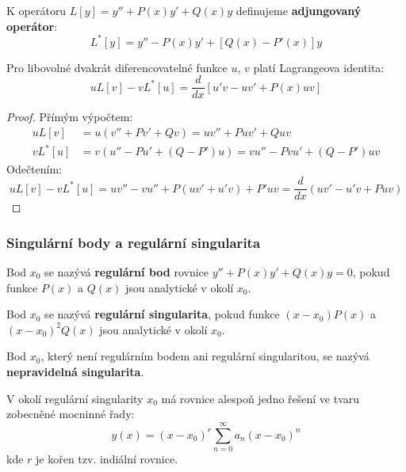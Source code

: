 \begin{definition}
K operátoru $L[y] = y'' + P(x)y' + Q(x)y$ definujeme \textbf{adjungovaný operátor}:
\[
L^*[y] = y'' - P(x)y' + [Q(x) - P'(x)]y
\]
\end{definition}

\begin{theorem}
Pro libovolné dvakrát diferencovatelné funkce $u$, $v$ platí Lagrangeova identita:
\[
uL[v] - vL^*[u] = \frac{d}{dx}[u'v - uv' + P(x)uv]
\]
\end{theorem}

\begin{proof}
Přímým výpočtem:
\begin{align*}
uL[v] &= u(v'' + Pv' + Qv) = uv'' + Puv' + Quv \\
vL^*[u] &= v(u'' - Pu' + (Q - P')u) = vu'' - Pvu' + (Q - P')uv
\end{align*}
Odečtením:
\[
uL[v] - vL^*[u] = u v'' - v u'' + P(uv' + u'v) + P'uv = \frac{d}{dx}(uv' - u'v + Puv)
\]
\end{proof}

\subsubsection{Singulární body a regulární singularita}
\label{subsubsec:singularni-body}

\begin{definition}
Bod $x_0$ se nazývá \textbf{regulární bod} rovnice $y'' + P(x)y' + Q(x)y = 0$, pokud funkce $P(x)$ a $Q(x)$ jsou analytické v okolí $x_0$.
\end{definition}

\begin{definition}
Bod $x_0$ se nazývá \textbf{regulární singularita}, pokud funkce $(x-x_0)P(x)$ a $(x-x_0)^2Q(x)$ jsou analytické v okolí $x_0$.
\end{definition}

\begin{definition}
Bod $x_0$, který není regulárním bodem ani regulární singularitou, se nazývá \textbf{nepravidelná singularita}.
\end{definition}

\begin{theorem}
V okolí regulární singularity $x_0$ má rovnice alespoň jedno řešení ve tvaru zobecněné mocninné řady:
\[
y(x) = (x-x_0)^r \sum_{n=0}^\infty a_n (x-x_0)^n
\]
kde $r$ je kořen tzv. indiální rovnice.
\end{theorem}

